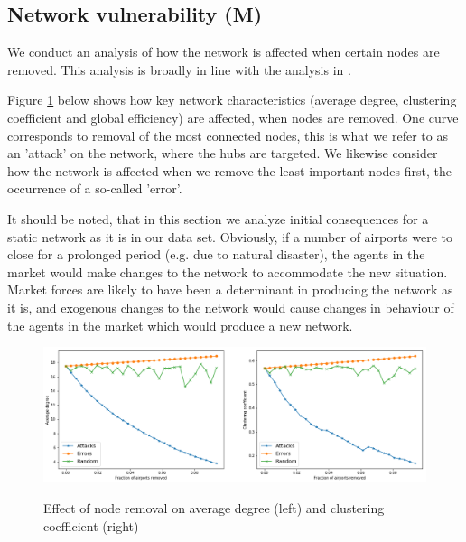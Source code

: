 \subsection{Network vulnerability (M)}
We conduct an analysis of how the network is affected when certain nodes are removed. This analysis is broadly in line with the analysis in \cite{chi2004structural}.
\par
Figure \ref{fig:attacks_and_errors} below shows how key network characteristics (average degree, clustering coefficient and global efficiency) are affected, when nodes are removed. One curve corresponds to removal of the most connected nodes, this is what we refer to as an 'attack' on the network, where the hubs are targeted. We likewise consider how the network is affected when we remove the least important nodes first, the occurrence of a so-called 'error'.
\par
It should be noted, that in this section we analyze initial consequences for a static network as it is in our data set. Obviously, if a number of airports were to close for a prolonged period (e.g. due to natural disaster), the agents in the market would make changes to the network to accommodate the new situation. Market forces are likely to have been a determinant in producing the network as it is, and exogenous changes to the network would cause changes in behaviour of the agents in the market which would produce a new network.
\begin{figure}[H]
  \centering
  \caption{Effect of node removal on average degree (left) and clustering coefficient (right)}
    \includegraphics[width=1. \textwidth]{Exam/Figures/attacksanderrors.png}
  \label{fig:attacks_and_errors}
\end{figure}

